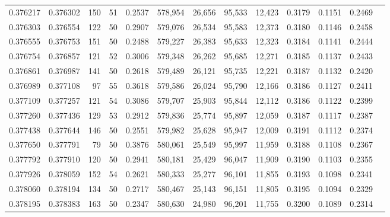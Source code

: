 \begin{tabular}{rrrrrrrrrrrrr}
0.376217 & 0.376302 &   150 &  51 &                                     0.2537 & 578,954 &  26,656 &  95,533 &  12,423 & 0.3179 & 0.1151 & 0.2469 \\
0.376303 & 0.376554 &   122 &  50 &                                     0.2907 & 579,076 &  26,534 &  95,583 &  12,373 & 0.3180 & 0.1146 & 0.2458 \\
0.376555 & 0.376753 &   151 &  50 &                                     0.2488 & 579,227 &  26,383 &  95,633 &  12,323 & 0.3184 & 0.1141 & 0.2444 \\
0.376754 & 0.376857 &   121 &  52 &                                     0.3006 & 579,348 &  26,262 &  95,685 &  12,271 & 0.3185 & 0.1137 & 0.2433 \\
0.376861 & 0.376987 &   141 &  50 &                                     0.2618 & 579,489 &  26,121 &  95,735 &  12,221 & 0.3187 & 0.1132 & 0.2420 \\
0.376989 & 0.377108 &    97 &  55 &                                     0.3618 & 579,586 &  26,024 &  95,790 &  12,166 & 0.3186 & 0.1127 & 0.2411 \\
0.377109 & 0.377257 &   121 &  54 &                                     0.3086 & 579,707 &  25,903 &  95,844 &  12,112 & 0.3186 & 0.1122 & 0.2399 \\
0.377260 & 0.377436 &   129 &  53 &                                     0.2912 & 579,836 &  25,774 &  95,897 &  12,059 & 0.3187 & 0.1117 & 0.2387 \\
0.377438 & 0.377644 &   146 &  50 &                                     0.2551 & 579,982 &  25,628 &  95,947 &  12,009 & 0.3191 & 0.1112 & 0.2374 \\
0.377650 & 0.377791 &    79 &  50 &                                     0.3876 & 580,061 &  25,549 &  95,997 &  11,959 & 0.3188 & 0.1108 & 0.2367 \\
0.377792 & 0.377910 &   120 &  50 &                                     0.2941 & 580,181 &  25,429 &  96,047 &  11,909 & 0.3190 & 0.1103 & 0.2355 \\
0.377926 & 0.378059 &   152 &  54 &                                     0.2621 & 580,333 &  25,277 &  96,101 &  11,855 & 0.3193 & 0.1098 & 0.2341 \\
0.378060 & 0.378194 &   134 &  50 &                                     0.2717 & 580,467 &  25,143 &  96,151 &  11,805 & 0.3195 & 0.1094 & 0.2329 \\
0.378195 & 0.378383 &   163 &  50 &                                     0.2347 & 580,630 &  24,980 &  96,201 &  11,755 & 0.3200 & 0.1089 & 0.2314 \\

\end{tabular}
